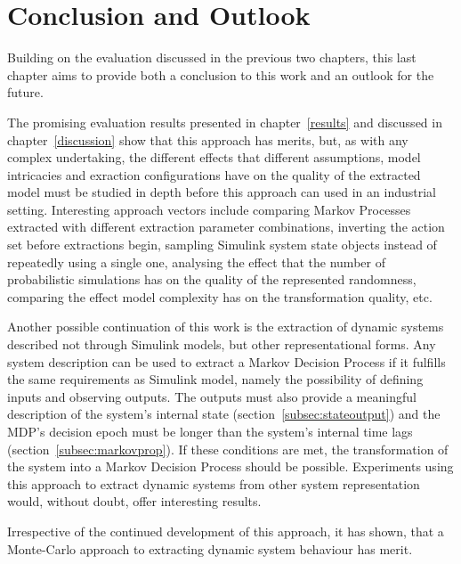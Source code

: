 \chapter{Conclusion and Outlook}
\label{conclusionoutlook}

Building on the evaluation discussed in the previous two chapters, this last chapter aims to provide both a conclusion to this work and an outlook for the future.

The promising evaluation results presented in chapter~\ref{results} and discussed in chapter~\ref{discussion} show that this approach has merits, but, as with any complex undertaking, the different effects that different assumptions, model intricacies and exraction configurations have on the quality of the extracted model must be studied in depth before this approach can used in an industrial setting. Interesting approach vectors include comparing Markov Processes extracted with different extraction parameter combinations, inverting the action set before extractions begin, sampling Simulink system state objects instead of repeatedly using a single one, analysing the effect that the number of probabilistic simulations has on the quality of the represented randomness, comparing the effect model complexity has on the transformation quality, etc.

Another possible continuation of this work is the extraction of dynamic systems described not through Simulink models, but other representational forms. Any system description can be used to extract a Markov Decision Process if it fulfills the same requirements as Simulink model, namely the possibility of defining inputs and observing outputs. The outputs must also provide a meaningful description of the system's internal state (section~\ref{subsec:stateoutput}) and the MDP's decision epoch must be longer than the system's internal time lags (section~\ref{subsec:markovprop}). If these conditions are met, the transformation of the system into a Markov Decision Process should be possible. Experiments using this approach to extract dynamic systems from other system representation would, without doubt, offer interesting results.

Irrespective of the continued development of this approach, it has shown, that a Monte-Carlo approach to extracting dynamic system behaviour has merit.
